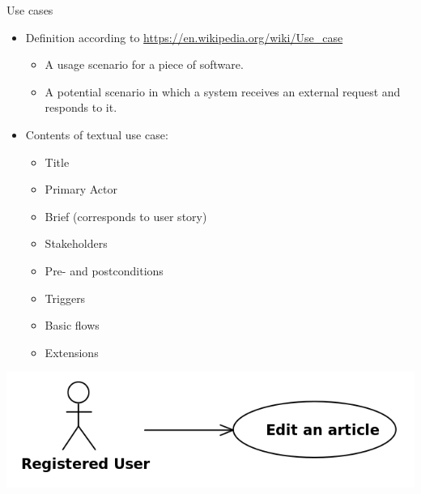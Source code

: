 \begin{Slide}{Use cases}
\begin{itemize}
\item Definition according to \url{https://en.wikipedia.org/wiki/Use_case}
\begin{itemize}
\item  A usage scenario for a piece of software.
\item  A potential scenario in which a system receives an external request and responds to it.

\end{itemize}
\end{itemize}
\vspace{-0.5em}
\begin{minipage}[t]{0.55\textwidth}
\begin{itemize}
\item Contents of textual use case:
\begin{itemize}
\item Title
\item Primary Actor
\item Brief (corresponds to user story)
\item Stakeholders
\item Pre- and postconditions
\item Triggers
\item Basic flows
\item Extensions
\end{itemize}
\end{itemize}
\end{minipage}%
\hfill\begin{minipage}[t]{0.45\textwidth}
\vspace{-0.4em}\includegraphics[width=1.0\textwidth]{../img/use-case-edit-article}
\end{minipage}
\end{Slide}
